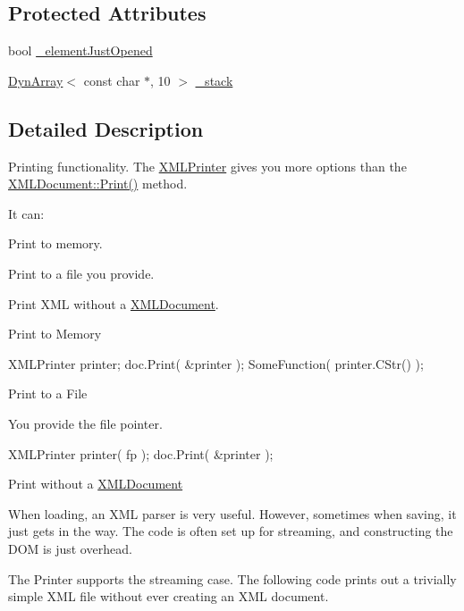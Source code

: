 \subsection*{Protected Attributes}
\begin{DoxyCompactItemize}
\item 
bool \hyperlink{classtinyxml2_1_1_x_m_l_printer_ac07169d58b465214a2b1fa306e617c26}{\+\_\+element\+Just\+Opened}
\item 
\hyperlink{classtinyxml2_1_1_dyn_array}{Dyn\+Array}$<$ const char $\ast$, 10 $>$ \hyperlink{classtinyxml2_1_1_x_m_l_printer_a99d59e67e084714541bee3ae43884bef}{\+\_\+stack}
\end{DoxyCompactItemize}


\subsection{Detailed Description}
Printing functionality. The \hyperlink{classtinyxml2_1_1_x_m_l_printer}{X\+M\+L\+Printer} gives you more options than the \hyperlink{classtinyxml2_1_1_x_m_l_document_a686ea28672c0e0c60383ec28148c1ac0}{X\+M\+L\+Document\+::\+Print()} method.

It can\+:
\begin{DoxyEnumerate}
\item Print to memory.
\item Print to a file you provide.
\item Print X\+M\+L without a \hyperlink{classtinyxml2_1_1_x_m_l_document}{X\+M\+L\+Document}.
\end{DoxyEnumerate}

Print to Memory

\begin{DoxyVerb}XMLPrinter printer;
doc.Print( &printer );
SomeFunction( printer.CStr() );
\end{DoxyVerb}


Print to a File

You provide the file pointer. \begin{DoxyVerb}XMLPrinter printer( fp );
doc.Print( &printer );
\end{DoxyVerb}


Print without a \hyperlink{classtinyxml2_1_1_x_m_l_document}{X\+M\+L\+Document}

When loading, an X\+M\+L parser is very useful. However, sometimes when saving, it just gets in the way. The code is often set up for streaming, and constructing the D\+O\+M is just overhead.

The Printer supports the streaming case. The following code prints out a trivially simple X\+M\+L file without ever creating an X\+M\+L document.

